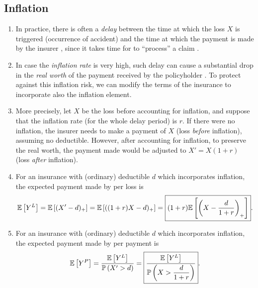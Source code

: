 \subsection{Inflation}
\begin{enumerate}
\item In practice, there is often a \emph{delay} between the time at which the loss
\(X\) is triggered (occurrence of accident) and the time at which the payment
 is made by the insurer , since it takes
time for  to ``process''  a claim
.

\item In case the \emph{inflation rate}  is very high, such
delay can cause a substantial drop in the \emph{real worth} of the payment
received by the policyholder . To protect against this inflation
risk, we can modify the terms of the insurance to incorporate also the
inflation element.

\item \label{it:inflation-setting}
More precisely, let \(X\) be the loss before accounting for inflation, and
suppose that the inflation rate (for the whole delay period) is \(r\). If there
were no inflation, the insurer  needs to make a payment
 of \(X\) (loss \emph{before} inflation), assuming no
deductible. However, after accounting for inflation, to preserve the real
worth, the payment made would be adjusted to \(X'=X(1+r)\) (loss \emph{after}
inflation).

\item \label{it:inflation-expr-yl}
For an insurance with (ordinary) deductible \(d\) which incorporates
inflation, the expected payment made by  per loss is
\[
\mathbb{E}\left[Y^L\right]=\mathbb{E}\left[(X'-d)_{+}\right]
=\mathbb{E}\left[((1+r)X-d)_{+}\right]
=\boxed{(1+r)\mathbb{E}\left[\qty(X-\frac{d}{1+r})_{+}\right]}.
\]
\item \label{it:inflation-expr-yp}
For an insurance with (ordinary) deductible \(d\) which incorporates
inflation, the expected payment made by  per payment is
\[
\mathbb{E}\left[Y^P\right]=\frac{\mathbb{E}\left[Y^L\right]}{\mathbb{P}\left(X'>d\right)}
=\boxed{\frac{\mathbb{E}\left[Y^L\right]}{\displaystyle \mathbb{P}\left(X>\frac{d}{1+r}\right)}}.
\]
\end{enumerate}
